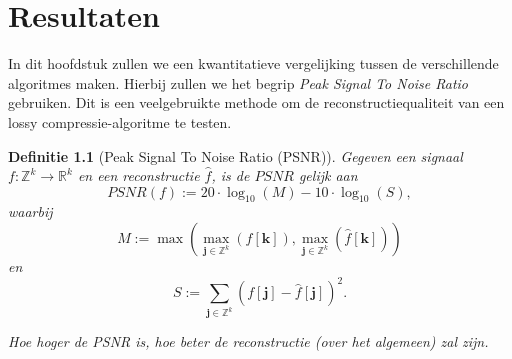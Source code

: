 \documentclass[11pt]{report}
\newcommand{\R}{\mathbb{R}}
\newcommand{\Z}{\mathbb{Z}}
\theoremstyle{plain}
\newtheorem*{definitie}{Definitie}
\theoremstyle{remark}
\begin{document}
\chapter{Resultaten}
In dit hoofdstuk zullen we een kwantitatieve vergelijking tussen de verschillende algoritmes maken. Hierbij zullen we het begrip \emph{Peak Signal To Noise Ratio} gebruiken. Dit is een veelgebruikte methode om de reconstructiequaliteit van een lossy compressie-algoritme te testen.

\begin{definitie}[Peak Signal To Noise Ratio (PSNR)]
Gegeven een signaal $f: \Z^k \to \R^k$ en een reconstructie $\hat f$, is de $PSNR$ gelijk aan
\[
	PSNR(f) := 20 \cdot \log_{10}( M ) - 10 \cdot \log_{10}(S),
\]
waarbij
\[
	M := \max( \max_{\boldsymbol j \in \Z^k} (f[\boldsymbol k]), \max_{\boldsymbol j \in \Z^k} (\hat f[\boldsymbol k]))
\]
en
\[
	S := \sum_{\boldsymbol j \in \Z^k} (f[\boldsymbol j] - \hat f[\boldsymbol j])^2.
\]

Hoe hoger de PSNR is, hoe beter de reconstructie (over het algemeen) zal zijn.
\end{definitie}
\end{document}
